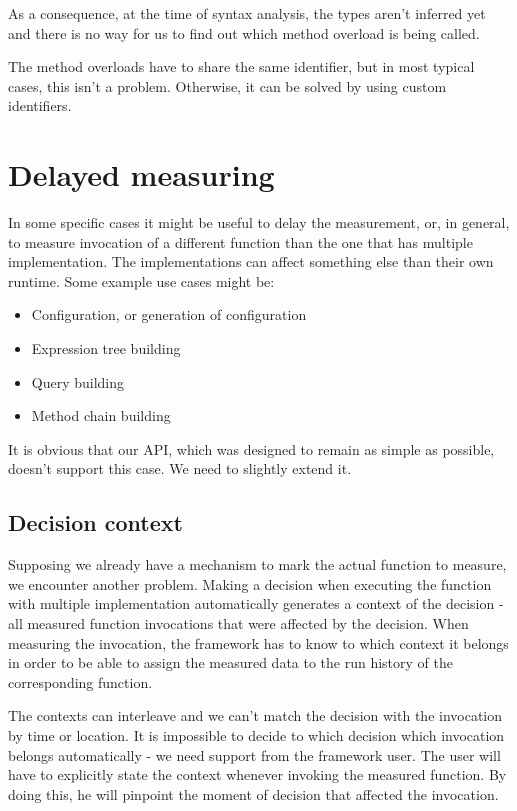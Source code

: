 As a consequence, at the time of syntax analysis, the types aren't inferred yet and there is no way for us to find out which method overload is being called.

The method overloads have to share the same identifier, but in most typical cases, this isn't a problem. Otherwise, it can be solved by using custom identifiers.
	
\section{Delayed measuring}

In some specific cases it might be useful to delay the measurement, or, in general, to measure invocation of a different function than the one that has multiple implementation. The implementations can affect something else than their own runtime. Some example use cases might be:

\begin{itemize}
	\item Configuration, or generation of configuration
	\item Expression tree building
	\item Query building
	\item Method chain building
\end{itemize}

It is obvious that our API, which was designed to remain as simple as possible, doesn't support this case. We need to slightly extend it.

\subsection{Decision context}

Supposing we already have a mechanism to mark the actual function to measure, we encounter another problem. Making a decision when executing the function with multiple implementation automatically generates a context of the decision - all measured function invocations that were affected by the decision. When measuring the invocation, the framework has to know to which context it belongs in order to be able to assign the measured data to the run history of the corresponding function.

The contexts can interleave and we can't match the decision with the invocation by time or location. It is impossible to decide to which decision which invocation belongs automatically - we need support from the framework user. The user will have to explicitly state the context whenever invoking the measured function. By doing this, he will pinpoint the moment of decision that affected the invocation.

